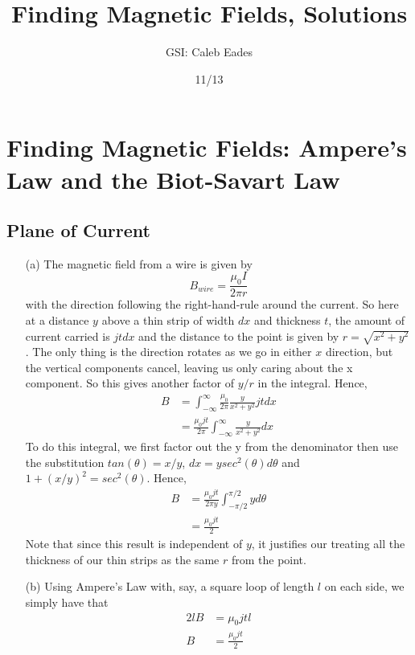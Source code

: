 \documentclass{article}
\begin{document}
\title{Finding Magnetic Fields, Solutions}
\author{GSI: Caleb Eades}
\date{11/13}
\maketitle

\section{Finding Magnetic Fields: Ampere's Law and the Biot-Savart Law}

\subsection{Plane of Current}

\begin{itemize}
\item[(a)] The magnetic field from a wire is given by
\begin{equation}
B_{wire} = \frac{\mu_0 I}{2\pi r}
\end{equation}
with the direction following the right-hand-rule around the current. So here at a distance $y$ above a thin strip of width $dx$ and thickness $t$, the amount of current carried is $jtdx$ and the distance to the point is given by $r = \sqrt{x^2+y^2}$. The only thing is the direction rotates as we go in either $x$ direction, but the vertical components cancel, leaving us only caring about the x component. So this gives another factor of $y/r$ in the integral. Hence,
\begin{align*}
B &= \int_{-\infty}^{\infty}\frac{\mu_0}{2\pi}\frac{y}{x^2+y^2}jtdx \\
&= \frac{\mu_0 jt}{2\pi}\int_{-\infty}^{\infty}\frac{y}{x^2+y^2}dx
\end{align*}
To do this integral, we first factor out the y from the denominator then use the substitution $tan(\theta) = x/y$, $dx = ysec^2(\theta)d\theta$ and $1+(x/y)^2 = sec^2(\theta)$. Hence,
\begin{align*}
B &= \frac{\mu_0 jt}{2\pi y}\int_{-\pi/2}^{\pi/2}yd\theta \\
&= \frac{\mu_0 jt}{2}
\end{align*}
Note that since this result is independent of $y$, it justifies our treating all the thickness of our thin strips as the same $r$ from the point.
\item[(b)] Using Ampere's Law with, say, a square loop of length $l$ on each side, we simply have that
\begin{align*}
2lB &= \mu_0 jtl \\
B &= \frac{\mu_0 jt}{2}
\end{align*}
\end{itemize}
\end{document}
